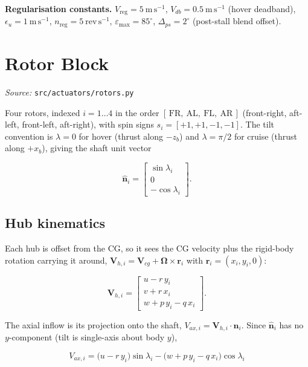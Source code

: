 \documentclass[11pt,a4paper]{article}
\newcommand{\vect}[1]{\bm{#1}}
\newcommand{\unit}[1]{\hat{\bm{#1}}}
\begin{document}
\noindent
\textbf{Regularisation constants.} $V_{\!\mathrm{reg}}=5\ \mathrm{m\,s^{-1}}$,
$V_{db}=0.5\ \mathrm{m\,s^{-1}}$ (hover deadband),
$\epsilon_u=1\ \mathrm{m\,s^{-1}}$, $n_{\mathrm{reg}}=5\ \mathrm{rev\,s^{-1}}$,
$\varepsilon_{\max}=85^\circ$, $\Delta_{ps}=2^\circ$ (post-stall blend offset).

\section{Rotor Block}
\emph{Source:} \texttt{src/actuators/rotors.py}

\medskip\noindent
Four rotors, indexed $i=1\ldots4$ in the order
$[\,\mathrm{FR},\ \mathrm{AL},\ \mathrm{FL},\ \mathrm{AR}\,]$
(front-right, aft-left, front-left, aft-right), with spin signs
$s_i=[+1,+1,-1,-1]$. The tilt convention is
$\lambda=0$ for hover (thrust along $-z_b$) and $\lambda=\pi/2$ for cruise
(thrust along $+x_b$), giving the shaft unit vector

\begin{equation}
\unit n_i =
\begin{bmatrix}\sin\lambda_i\\[1mm] 0 \\[1mm] -\cos\lambda_i\end{bmatrix}.
\end{equation}

\subsection{Hub kinematics}
Each hub is offset from the CG, so it sees the CG velocity plus the rigid-body
rotation carrying it around, $\vect V_{h,i}=\vect V_{cg}+\vect\Omega\times\vect r_i$
with $\vect r_i=(x_i,y_i,0)$:

\begin{equation}
\vect V_{h,i}=
\begin{bmatrix}
u - r\,y_i \\
v + r\,x_i \\
w + p\,y_i - q\,x_i
\end{bmatrix}.
\end{equation}

The axial inflow is its projection onto the shaft, $V_{ax,i}=\vect V_{h,i}\cdot\unit n_i$.
Since $\unit n_i$ has no $y$-component (tilt is single-axis about body $y$),

\begin{equation}
\boxed{\;
V_{ax,i}=\bigl(u-r\,y_i\bigr)\sin\lambda_i-\bigl(w+p\,y_i-q\,x_i\bigr)\cos\lambda_i \;}
\end{equation}
\end{document}
